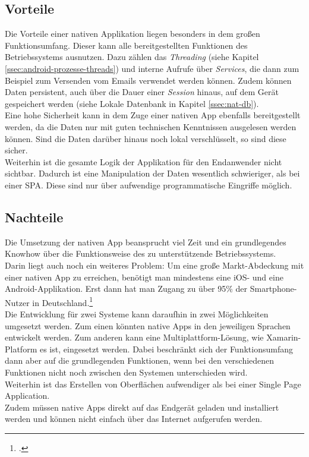 \subsection{Vorteile}
\label{sec:vorteile-native-app}
Die Vorteile einer nativen Applikation liegen besonders in dem großen Funktionsumfang. Dieser kann alle bereitgestellten Funktionen des Betriebssystems ausnutzen. Dazu zählen das \textit{Threading} (siehe Kapitel \ref{ssec:android-prozesse-threads}) und interne Aufrufe über \textit{Services}, die dann zum Beispiel zum Versenden vom Emails verwendet werden können. Zudem können Daten persistent, auch über die Dauer einer \textit{Session} hinaus, auf dem Gerät gespeichert werden (siehe Lokale Datenbank in Kapitel \ref{ssec:nat-db}).\\
Eine hohe Sicherheit kann in dem Zuge einer nativen App ebenfalls bereitgestellt werden, da die Daten nur mit guten technischen Kenntnissen ausgelesen werden können. Sind die Daten darüber hinaus noch lokal verschlüsselt, so sind diese sicher.\\
Weiterhin ist die gesamte Logik der Applikation für den Endanwender nicht sichtbar. Dadurch ist eine Manipulation der Daten wesentlich schwieriger, als bei einer \ac{SPA}. Diese sind nur über aufwendige programmatische Eingriffe möglich.

\subsection{Nachteile}
\label{sec:nachteile-native-app}
Die Umsetzung der nativen \gls{App} beansprucht viel Zeit und ein grundlegendes Knowhow über die Funktionsweise des zu unterstützende Betriebssystems.\\
Darin liegt auch noch ein weiteres Problem: Um eine große Markt-Abdeckung mit einer nativen \gls{App} zu erreichen, benötigt man mindestens eine iOS- und eine Android-Applikation. Erst dann hat man Zugang zu über 95\% der Smartphone-Nutzer in Deutschland.\footcite{Statista-SmartphoneVerteilung}\\
Die Entwicklung für zwei Systeme kann daraufhin in zwei Möglichkeiten umgesetzt werden. Zum einen könnten native Apps in den jeweiligen Sprachen entwickelt werden. Zum anderen kann eine Multiplattform-Lösung, wie Xamarin-Platform es ist, eingesetzt werden. Dabei beschränkt sich der Funktionsumfang dann aber auf die grundlegenden Funktionen, wenn bei den verschiedenen Funktionen nicht noch zwischen den Systemen unterschieden wird.\\
Weiterhin ist das Erstellen von Oberflächen aufwendiger als bei einer Single Page Application.\\
Zudem müssen native Apps direkt auf das Endgerät geladen und installiert werden und können nicht einfach über das Internet aufgerufen werden. 

